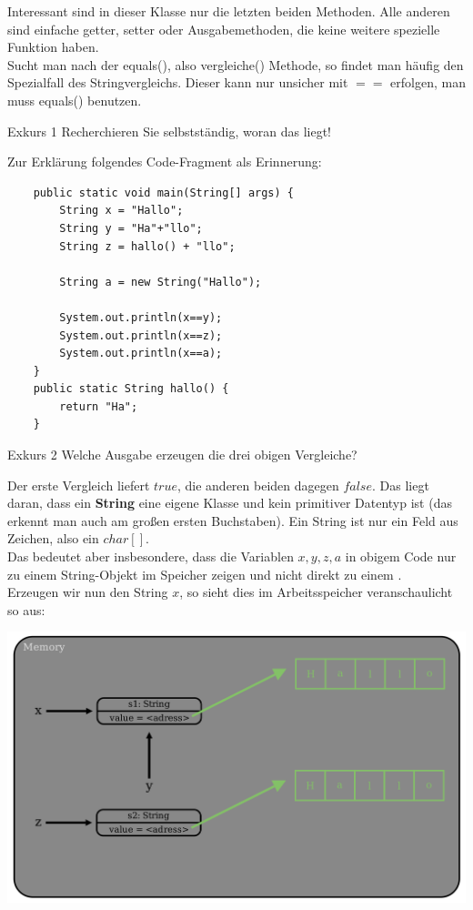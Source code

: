 \documentclass{article}
\begin{document}
Interessant sind in dieser Klasse nur die letzten beiden Methoden. Alle anderen sind einfache getter, setter oder Ausgabemethoden, die keine weitere spezielle Funktion haben. \\
Sucht man nach der equals(), also vergleiche() Methode, so findet man häufig den Spezialfall des Stringvergleichs. Dieser kann nur unsicher mit $==$ erfolgen, man muss equals() benutzen. \\
\begin{task}{Exkurs 1}
    Recherchieren Sie selbstständig, woran das liegt!
\end{task}
Zur Erklärung folgendes Code-Fragment als Erinnerung:
\begin{verbatim}
    public static void main(String[] args) {
        String x = "Hallo";
        String y = "Ha"+"llo";
        String z = hallo() + "llo";

        String a = new String("Hallo");

        System.out.println(x==y);
        System.out.println(x==z);
        System.out.println(x==a);
    }
    public static String hallo() {
        return "Ha";
    }
\end{verbatim}
\begin{task}{Exkurs 2}
    Welche Ausgabe erzeugen die drei obigen Vergleiche?
\end{task}
\vspace{2cm}
Der erste Vergleich liefert $true$, die anderen beiden dagegen $false$. Das liegt daran, dass ein \textbf{String} eine eigene Klasse und kein primitiver Datentyp ist (das erkennt man auch am großen ersten Buchstaben). Ein String ist  nur ein Feld aus Zeichen, also ein $char[]$. \\
Das bedeutet aber insbesondere, dass die Variablen $x,y,z,a$ in obigem Code nur zu einem String-Objekt im Speicher zeigen und nicht direkt zu einem . \\
Erzeugen wir nun den String $x$, so sieht dies im Arbeitsspeicher veranschaulicht so aus: 
\begin{center}
    \includegraphics[scale=0.2]{../../media/string_memory.png}  
\end{center}
\end{document}
